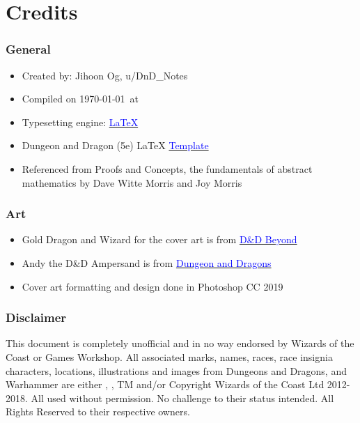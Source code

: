 \documentclass[../MATH-2000-Notes.tex]{subfiles}
\begin{document}
\chapter*{Credits}
\subsection*{General}
\begin{itemize}
    \item Created by: Jihoon Og, u/DnD\_Notes
    \item Compiled on \today\  at \currenttime
    \item Typesetting engine: \href{https://www.latex-project.org/}{\textcolor{blue}{\LaTeX}}
    \item Dungeon and Dragon (5e) LaTeX \href{https://github.com/rpgtex/DND-5e-LaTeX-Template}{\textcolor{blue}{Template}}
    \item Referenced from Proofs and Concepts, the fundamentals of abstract mathematics by Dave Witte Morris and Joy Morris
\end{itemize}
\subsection*{Art}
\begin{itemize}
    \item Gold Dragon and Wizard for the cover art is from \href{https://www.dndbeyond.com/}{\textcolor{blue}{D\&D Beyond}}
    \item Andy the D\&D Ampersand is from \href{https://www.dnd.wizards.com}{\textcolor{blue}{Dungeon and Dragons}} 
    \item Cover art formatting and design done in Photoshop CC 2019
\end{itemize}

\subsection*{Disclaimer}
This document is completely unofficial and in no way endorsed by Wizards of the Coast or Games Workshop. All associated marks, names, races, race insignia characters, locations, illustrations and images from Dungeons and Dragons, and Warhammer are either \textregistered, \textcopyright, TM and/or Copyright Wizards of the Coast Ltd 2012-2018. All used without permission. No challenge to their status intended. All Rights Reserved to their respective owners.
\end{document}

